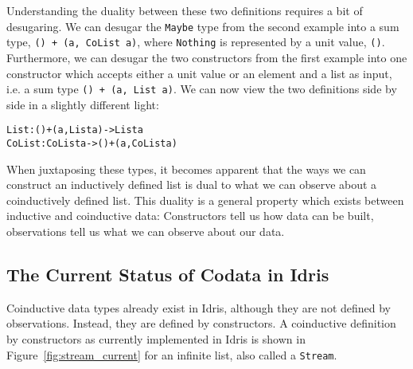 Understanding the duality between these two definitions requires a bit of desugaring. We can desugar the \texttt{Maybe} type from the second example into a sum type, \texttt{() + (a, CoList a)}, where \texttt{Nothing} is represented by a unit value, \texttt{()}. Furthermore, we can desugar the two constructors from the first example into one constructor which accepts either a unit value or an element and a list as input, i.e. a sum type \texttt{() + (a, List a)}. We can now view the two definitions side by side in a slightly different light:

\begin{alltt}
List   : () + (a, List a)   ->   List a
CoList : CoList a           ->   () + (a, CoList a)
\end{alltt}

When juxtaposing these types, it becomes apparent that the ways we can construct an inductively defined list is dual to what we can observe about a coinductively defined list. This duality is a general property which exists between inductive and coinductive data: Constructors tell us how data can be built, observations tell us what we can observe about our data.


\subsection{The Current Status of Codata in Idris}
\label{sec:stateinidris}
Coinductive data types already exist in Idris, although they are not defined by observations. Instead, they are defined by constructors. A coinductive definition by constructors as currently implemented in Idris is shown in Figure~\ref{fig:stream_current} for an infinite list, also called a \texttt{Stream}.

